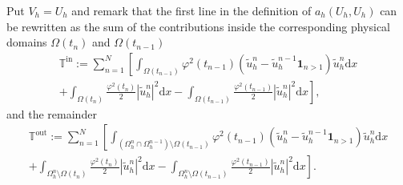 \documentclass[11pt,a4paper]{article}
\theoremstyle{plain}
\theoremstyle{definition}
\theoremstyle{remark}
\numberwithin{equation}{section}
\newcommand{\dx}{\mathrm{d}x}
\begin{document}
Put $V_h = U_h$ and remark that the first line in the definition of $a_h (U_h,
U_h)$ can be rewritten as the sum of the contributions inside the
corresponding physical domains $\Omega (t_n)$ and $\Omega (t_{n - 1})$
\begin{multline}  \label{termsIN}
	\mathbb{T}^{\text{in}}:=
	\sum_{n = 1}^N \left[ \int_{\Omega (t_{n - 1})} \varphi^2 (t_{n
  - 1}) (\tilde{u}_h^n - \tilde{u}_h^{n - 1} \mathbf{1}_{n > 1})
  \tilde{u}_h^n \dx \right.\\
  \left. + \int_{\Omega (t_n)} \frac{\varphi^2 (t_n)}{2} | \tilde{u}_h^n |^2
  \dx - \int_{\Omega (t_{n - 1})} \frac{\varphi^2 (t_{n - 1})}{2} |
  \tilde{u}_h^n |^2 \dx \right],
\end{multline}
and the remainder
\begin{multline}  \label{termsOUT}
  \mathbb{T}^{\text{out}}:=
	\sum_{n = 1}^N \left[ \int_{(\Omega_h^n \cap \Omega_h^{n -
  1}) \setminus \Omega (t_{n - 1})} \varphi^2 (t_{n - 1}) (\tilde{u}_h^n -
  \tilde{u}_h^{n - 1} \mathbf{1}_{n > 1}) \tilde{u}_h^n \dx \right.\\
  \left. + \int_{\Omega_h^n \setminus \Omega (t_n)} \frac{\varphi^2 (t_n)}{2} |
  \tilde{u}_h^n |^2 \dx - \int_{\Omega_h^n \setminus \Omega (t_{n - 1})}
  \frac{\varphi^2 (t_{n - 1})}{2} | \tilde{u}_h^n |^2 \dx \right] .
\end{multline}
\end{document}
